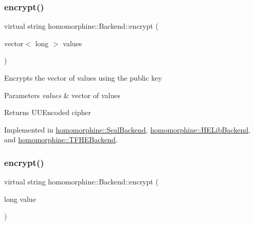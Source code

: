 \subsubsection{\texorpdfstring{encrypt()}{encrypt()}\hspace{0.1cm}{\footnotesize\ttfamily [1/2]}}
{\footnotesize\ttfamily virtual string homomorphine\+::\+Backend\+::encrypt (\begin{DoxyParamCaption}\item[{vector$<$ long $>$}]{values }\end{DoxyParamCaption})\hspace{0.3cm}{\ttfamily [pure virtual]}}

Encrypts the vector of values using the public key


\begin{DoxyParams}{Parameters}
{\em values} & vector of values \\
\hline
\end{DoxyParams}
\begin{DoxyReturn}{Returns}
U\+U\+Encoded cipher 
\end{DoxyReturn}


Implemented in \mbox{\hyperlink{classhomomorphine_1_1_seal_backend_a0c9f992fb7626e55ad0bbfcc068e8e43}{homomorphine\+::\+Seal\+Backend}}, \mbox{\hyperlink{classhomomorphine_1_1_h_e_lib_backend_af030a10bdd905f7cccf72c8eabfefdd7}{homomorphine\+::\+H\+E\+Lib\+Backend}}, and \mbox{\hyperlink{classhomomorphine_1_1_t_f_h_e_backend_ac81185b563e8865387df97e1cc381e30}{homomorphine\+::\+T\+F\+H\+E\+Backend}}.

\mbox{\label{classhomomorphine_1_1_backend_a05ee154a7a5dd88a4a0589165fae9f97}} 
\subsubsection{\texorpdfstring{encrypt()}{encrypt()}\hspace{0.1cm}{\footnotesize\ttfamily [2/2]}}
{\footnotesize\ttfamily virtual string homomorphine\+::\+Backend\+::encrypt (\begin{DoxyParamCaption}\item[{long}]{value }\end{DoxyParamCaption})\hspace{0.3cm}{\ttfamily [pure virtual]}}

